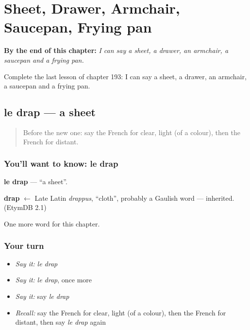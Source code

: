
\chapter{Sheet, Drawer, Armchair, Saucepan, Frying pan}
\label{ch:fr-sheet-drawer-armchair-saucepan-frying-pan}

\begin{chapteropening}
\textbf{By the end of this chapter:} \emph{I can say a sheet, a drawer, an armchair, a saucepan and a frying pan.}

Complete the last lesson of chapter 193: I can say a sheet, a drawer, an armchair, a saucepan and a frying pan.
\end{chapteropening}

\section[le drap]{le drap — a sheet}

\label{lesson:FR-C193-drap}



\begin{quote}
Before the new one: say the French for clear, light (of a colour), then the French for distant.
\end{quote}

\subsection*{You'll want to know: le drap}
\textbf{le drap} — \textquotedblleft{}a sheet\textquotedblright{}.

\begin{cousinweb}
\textbf{drap} $\leftarrow$ Late Latin \emph{drappus}, \textquotedblleft{}cloth\textquotedblright{}, probably a Gaulish word — inherited. (EtymDB 2.1)
\end{cousinweb}

\begin{grammarlens}[title={What you've built}]
One more word for this chapter.
\end{grammarlens}

\subsection*{Your turn}
\begin{itemize}
\raggedright
  \item \emph{Say it:} \emph{le drap}
  \item \emph{Say it:} \emph{le drap}, once more
  \item \emph{Say it:} say \emph{le drap}
  \item \emph{Recall:} say the French for clear, light (of a colour), then the French for distant, then say \emph{le drap} again
\end{itemize}

